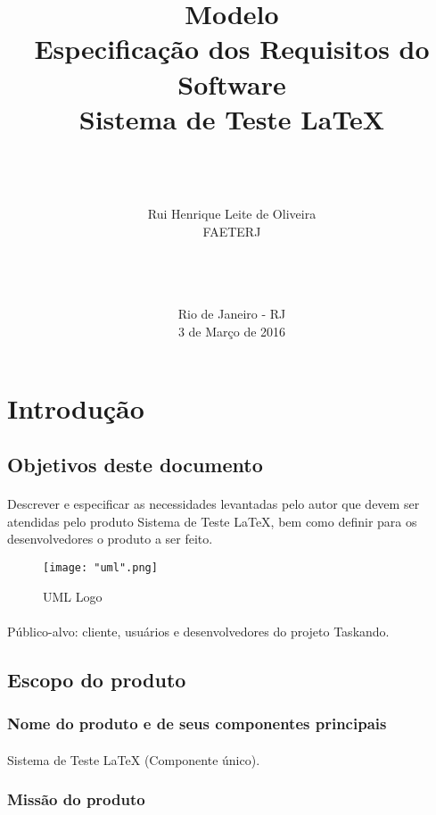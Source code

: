 \documentclass[12pt]{article}
\title{Modelo\\Especificação dos Requisitos do Software\\ Sistema de Teste LaTeX}
\author{\\ \\ \\Rui Henrique Leite de Oliveira \\ FAETERJ\\ \\ \\ \\}
\date{Rio de Janeiro - RJ \\ 3 de Março de 2016}
\begin{document}
\maketitle
\newpage

\thispagestyle{empty}
\listoffigures
\newpage

\thispagestyle{empty}
\listoftables
\newpage

\thispagestyle{empty}
\tableofcontents
\newpage

\section{Introdução}
	\subsection{Objetivos deste documento}
		\paragraph{}Descrever e especificar as necessidades levantadas pelo autor que devem ser atendidas pelo produto Sistema de Teste LaTeX, bem como definir para os desenvolvedores o produto a ser feito.
		
		\begin{figure}[!h]
			\caption{UML Logo}
			\centering
			\texttt{[image: "uml".png]}
		\end{figure}
		
		\paragraph{}Público-alvo: cliente, usuários e desenvolvedores do projeto Taskando.
	\subsection{Escopo do produto}
		\subsubsection{Nome do produto e de seus componentes principais}
			\paragraph{}Sistema de Teste LaTeX (Componente único).
		\subsubsection{Missão do produto}
\end{document}
